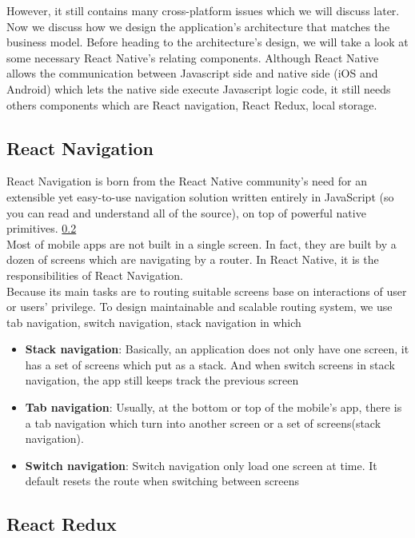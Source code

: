 However, it still contains many cross-platform issues which we will discuss later. Now we discuss how we design the application's architecture that matches the business model.
Before heading to the architecture's design, we will take a look at some necessary React Native's relating components. 
Although React Native allows the communication between Javascript side and native side (iOS and Android) which lets the native side execute Javascript logic code, it still needs others components 
which are React navigation, React Redux, local storage.\\
\subsection{React Navigation}
React Navigation is born from the React Native community's need for 
an extensible yet easy-to-use navigation solution written entirely in JavaScript 
(so you can read and understand all of the source), on top of powerful native primitives. \ref{}\\ %

Most of mobile apps are not built in a single screen. In fact, they are built by a dozen of screens which are navigating by 
a router. In React Native, it is the responsibilities of React Navigation.\\

Because its main tasks are to routing suitable screens base on interactions of user or users' privilege.
To design maintainable and scalable routing system, we use tab navigation, switch navigation, stack navigation in which \\
\begin{itemize}
    \item \textbf{Stack navigation}: Basically, an application does not only have one screen, it has a set of screens which put as a stack. And when switch screens in stack navigation, the app still keeps track the previous screen
    \item \textbf{Tab navigation}: Usually, at the bottom or top of the mobile's app, there is a tab navigation which turn into another screen or a set of screens(stack navigation).
    \item \textbf{Switch navigation}: Switch navigation only load one screen at time. It default resets the route when switching between screens
\end{itemize}

\subsection{React Redux}

